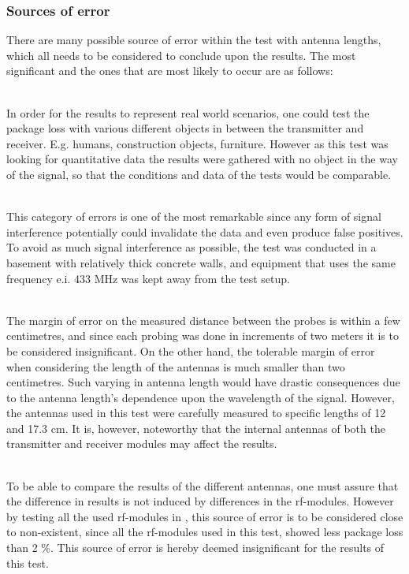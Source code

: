 \subsubsection*{Sources of error}
There are many possible source of error within the test with antenna lengths, which all needs to be considered to conclude upon the results.
The most significant and the ones that are most likely to occur are as follows:
\begin{description}[labelindent=\parindent]
    \item[Objects placed in the way of the signal] \hfill \\
    In order for the results to represent real world scenarios, one could test the package loss with various different objects in between the transmitter and receiver. 
    E.g. humans, construction objects, furniture.
    However as this test was looking for quantitative data the results were gathered with no object in the way of the signal, so that the conditions and data of the tests would be comparable.
    \item[Signal interference] \hfill \\
    This category of errors is one of the most remarkable since any form of signal interference potentially could invalidate the data and even produce false positives.
    To avoid as much signal interference as possible, the test was conducted in a basement with relatively thick concrete walls, and equipment that uses the same frequency e.i. 433 MHz was kept away from the test setup.
    \item[Inaccuracy in distance and antenna length] \hfill \\
    The margin of error on the measured distance between the probes is within a few centimetres, and since each probing was done in increments of two meters it is to be considered insignificant.
    On the other hand, the tolerable margin of error when considering the length of the antennas is much smaller than two centimetres.
    Such varying in antenna length would have drastic consequences due to the antenna length's dependence upon the wavelength of the signal.
    However, the antennas used in this test were carefully measured to specific lengths of 12 and 17.3 cm.
    It is, however, noteworthy that the internal antennas of both the transmitter and receiver modules may affect the results.
    \item[Difference in \acrshort{rf}-modules] \hfill \\
    To be able to compare the results of the different antennas, one must assure that the difference in results is not induced by differences in the \gls{rf}-modules.
    However by testing all the used \gls{rf}-modules in , this source of error is to be considered close to non-existent, since all the \gls{rf}-modules used in this test, showed less package loss than 2 \%.
    This source of error is hereby deemed insignificant for the results of this test.
\end{description}

